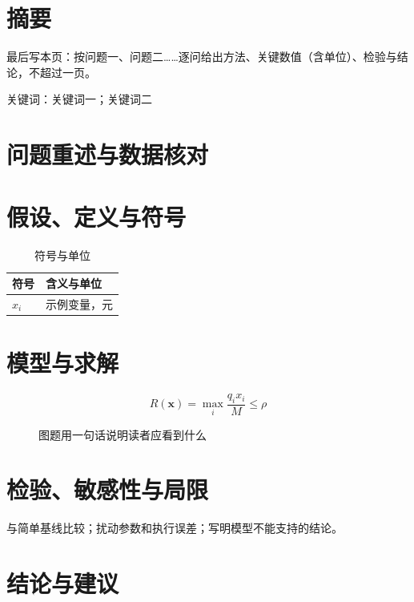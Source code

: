 \documentclass[a4paper,12pt,fontset=none]{ctexart}
\begin{document}
\begin{center}{\bfseries{}\PraxisTitle}\end{center}
\section*{摘\hspace{1em}要}
最后写本页：按问题一、问题二……逐问给出方法、关键数值（含单位）、检验与结论，不超过一页。\par
关键词：关键词一；关键词二

\clearpage
\section{问题重述与数据核对}
\section{假设、定义与符号}
\begin{table}[htbp]\centering\small\caption{符号与单位}
\begin{tabular}{ll}\toprule 符号 & 含义与单位\\ \midrule $x_i$ & 示例变量，元\\ \bottomrule\end{tabular}\end{table}
\section{模型与求解}
\begin{equation}R(\mathbf{x})=\max_{i}\frac{q_ix_i}{M}\le\rho\end{equation}
\begin{figure}[htbp]\centering
{}
\caption{图题用一句话说明读者应看到什么}\end{figure}
\section{检验、敏感性与局限}
与简单基线比较；扰动参数和执行误差；写明模型不能支持的结论。
\section{结论与建议}
\end{document}

